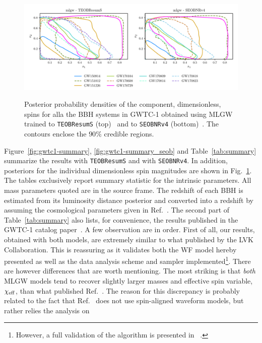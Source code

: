 \begin{figure}[t]
	\centering
    \includegraphics[width=\textwidth]{img/spins_TEOB_SEOB.pdf}\\
	\caption{Posterior probability densities of the component, dimensionless, spins for alla the BBH systems in GWTC-1 
	obtained using MLGW trained to {\tt TEOBResumS} (top)~\cite{Nagar:2020pcj}  and to {\tt SEOBNRv4} (bottom)~\cite{Bohe:2016gbl}. 
	The contours enclose the $90\%$ credible regions.}
	\label{fig:gwtc1_eob_spins}
\end{figure}
Figure~\ref{fig:gwtc1-summary}, \ref{fig:gwtc1-summary_seob} and Table~\ref{tab:summary} summarize the results
with {\tt TEOBResumS} and with {\tt SEOBNRv4}. In addition, posteriors for the individual dimensionless
spin magnitudes are shown in Fig.~\ref{fig:gwtc1_eob_spins}. The tables exclusively report
summary statistic for the intrinsic parameters. All mass parameters quoted are in the source frame. 
The redshift of each BBH is estimated from its luminosity distance posterior and 
converted into a redshift by assuming the cosmological parameters given in Ref.~\cite{}.
The second part of Table~\ref{tab:summary} also lists, for convenience, the results
published in the GWTC-1 catalog paper~\cite{LIGOScientific:2018mvr}.
A few observation are in order. First of all, our results, obtained with both models,
are extremely similar to what published by the LVK Collaboration. 
This is reassuring as it validates both the WF model hereby presented 
as well as the data analysis scheme and sampler 
implemented\footnote{However, a full validation of the algorithm is presented in ~\cite{}.}.
There are however differences that are worth mentioning. The most striking is that
{\it both} MLGW models tend to recover slightly larger masses and effective 
spin variable, $\chi_{\rm eff}$, than what published Ref.~\cite{LIGOScientific:2018mvr}.
The reason for this discrepancy is probably related to the fact that Ref.~\cite{LIGOScientific:2018mvr}
does not use spin-aligned waveform models, but rather relies the analysis on 
